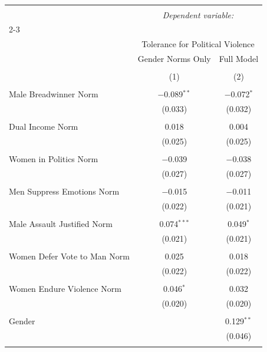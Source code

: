
\begin{table}[!htbp] \centering 
  \caption{} 
  \label{} 
\begin{tabular}{@{\extracolsep{5pt}}lcc} 
\\[-1.8ex]\hline 
\hline \\[-1.8ex] 
 & \multicolumn{2}{c}{\textit{Dependent variable:}} \\ 
\cline{2-3} 
\\[-1.8ex] & \multicolumn{2}{c}{Tolerance for Political Violence} \\ 
 & Gender Norms Only & Full Model \\ 
\\[-1.8ex] & (1) & (2)\\ 
\hline \\[-1.8ex] 
 Male Breadwinner Norm & $-$0.089$^{**}$ & $-$0.072$^{*}$ \\ 
  & (0.033) & (0.032) \\ 
  & & \\ 
 Dual Income Norm & 0.018 & 0.004 \\ 
  & (0.025) & (0.025) \\ 
  & & \\ 
 Women in Politics Norm & $-$0.039 & $-$0.038 \\ 
  & (0.027) & (0.027) \\ 
  & & \\ 
 Men Suppress Emotions Norm & $-$0.015 & $-$0.011 \\ 
  & (0.022) & (0.021) \\ 
  & & \\ 
 Male Assault Justified Norm & 0.074$^{***}$ & 0.049$^{*}$ \\ 
  & (0.021) & (0.021) \\ 
  & & \\ 
 Women Defer Vote to Man Norm & 0.025 & 0.018 \\ 
  & (0.022) & (0.022) \\ 
  & & \\ 
 Women Endure Violence Norm & 0.046$^{*}$ & 0.032 \\ 
  & (0.020) & (0.020) \\ 
  & & \\ 
 Gender &  & 0.129$^{**}$ \\ 
  &  & (0.046) \\ 
  & & \\ 

\end{tabular}
\end{table}
